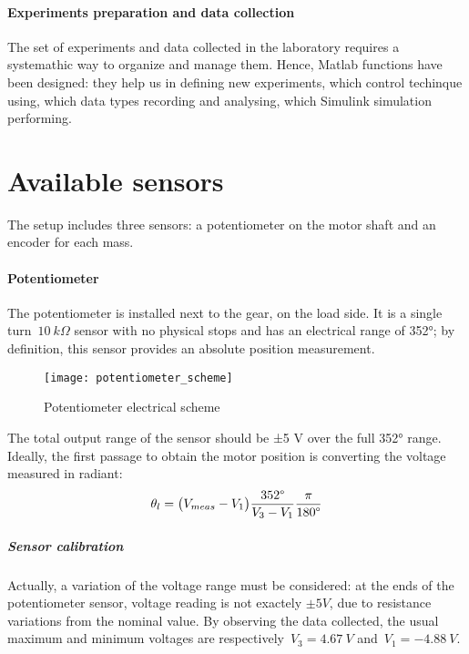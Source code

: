 
\paragraph{Experiments preparation and data collection}

The set of experiments and data collected in the laboratory requires a systemathic way to organize and manage them. Hence, Matlab functions have been designed: they help us in defining new experiments, which control techinque using, which data types recording and analysing, which Simulink simulation performing.

\section{Available sensors} \label{sec:sensors}

The setup includes three sensors: a potentiometer on the motor shaft and an encoder for each mass.

\paragraph{Potentiometer}

The potentiometer is installed next to the gear, on the load side. It is a single turn~$10 \ k\Omega$ sensor with no physical stops and has an electrical range of 352°; by definition, this sensor provides an absolute position measurement. \\
\begin{figure*}[h]
	\centering
	\texttt{[image: potentiometer\_scheme]}
	\caption{Potentiometer electrical scheme}
\end{figure*}

The total output range of the sensor should be ±5 V over the full 352° range.
Ideally, the first passage to obtain the motor position is converting the voltage measured in radiant:
\[
	\theta_l = \bigl{(} V_{meas} - V_1 \bigr{)} \frac{352 \degree }{V_3 - V_1} \frac{\pi}{180 \degree }
\]

\subparagraph{Sensor calibration}
Actually, a variation of the voltage range must be considered: at the ends of the potentiometer sensor, voltage reading is not exactely $\pm 5V$, due to resistance variations from the nominal value. By observing the data collected, the usual maximum and minimum voltages are respectively~$V_3=4.67 \ V$ and~$V_1=-4.88 \ V$.

